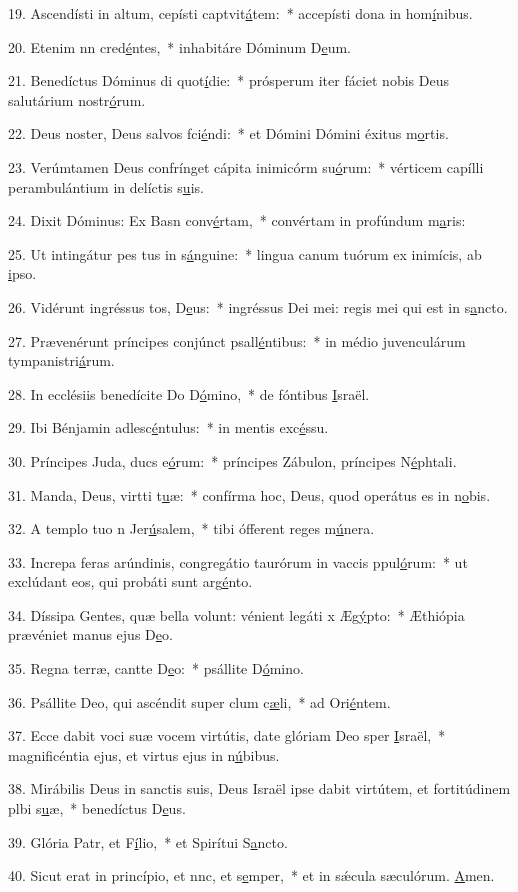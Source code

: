 19. Ascendísti in altum, cepísti captvit\uline{á}tem:~* accepísti dona in hom\uline{í}nibus.\par 
20. Etenim nn cred\uline{é}ntes,~* inhabitáre Dóminum D\uline{e}um.\par 
21. Benedíctus Dóminus di quot\uline{í}die:~* prósperum iter fáciet nobis Deus salutárium nostr\uline{ó}rum.\par 
22. Deus noster, Deus salvos fci\uline{é}ndi:~* et Dómini Dómini éxitus m\uline{o}rtis.\par 
23. Verúmtamen Deus confrínget cápita inimicórm su\uline{ó}rum:~* vérticem capílli perambulántium in delíctis s\uline{u}is.\par 
24. Dixit Dóminus: Ex Basn conv\uline{é}rtam,~* convértam in profúndum m\uline{a}ris:\par 
25. Ut intingátur pes tus in s\uline{á}nguine:~* lingua canum tuórum ex inimícis, ab \uline{i}pso.\par 
26. Vidérunt ingréssus tos, D\uline{e}us:~* ingréssus Dei mei: regis mei qui est in s\uline{a}ncto.\par 
27. Prævenérunt príncipes conjúnct psall\uline{é}ntibus:~* in médio juvenculárum tympanistri\uline{á}rum.\par 
28. In ecclésiis benedícite Do D\uline{ó}mino,~* de fóntibus \uline{I}sraël.\par 
29. Ibi Bénjamin adlesc\uline{é}ntulus:~* in mentis exc\uline{é}ssu.\par 
30. Príncipes Juda, ducs e\uline{ó}rum:~* príncipes Zábulon, príncipes N\uline{é}phtali.\par 
31. Manda, Deus, virtti t\uline{u}æ:~* confírma hoc, Deus, quod operátus es in n\uline{o}bis.\par 
32. A templo tuo n Jer\uline{ú}salem,~* tibi ófferent reges m\uline{ú}nera.\par 
33. Increpa feras arúndinis, congregátio taurórum in vaccis ppul\uline{ó}rum:~* ut exclúdant eos, qui probáti sunt arg\uline{é}nto.\par 
34. Díssipa Gentes, quæ bella volunt: vénient legáti x Æg\uline{ý}pto:~* Æthiópia prævéniet manus ejus D\uline{e}o.\par 
35. Regna terræ, cantte D\uline{e}o:~* psállite D\uline{ó}mino.\par 
36. Psállite Deo, qui ascéndit super clum c\uline{æ}li,~* ad Ori\uline{é}ntem.\par 
37. Ecce dabit voci suæ vocem virtútis, date glóriam Deo sper \uline{I}sraël,~* magnificéntia ejus, et virtus ejus in n\uline{ú}bibus.\par 
38. Mirábilis Deus in sanctis suis, Deus Israël ipse dabit virtútem, et fortitúdinem plbi s\uline{u}æ,~* benedíctus D\uline{e}us.\par 
39. Glória Patr, et F\uline{í}lio,~* et Spirítui S\uline{a}ncto.\par 
40. Sicut erat in princípio, et nnc, et s\uline{e}mper,~* et in sǽcula sæculórum. \uline{A}men.\par 
